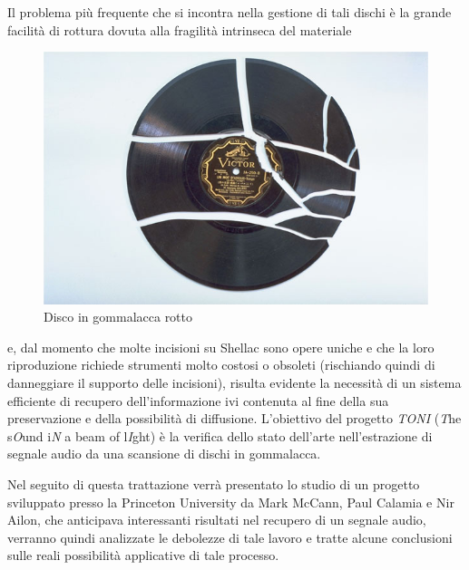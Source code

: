 Il problema pi\`u frequente che si incontra nella gestione di tali dischi \`e la grande facilit\`a di rottura dovuta alla fragilit\`a intrinseca del materiale
\begin{figure}[h!t]
\begin{center}
\includegraphics[scale=0.4]{./img/broken_disc.jpg}
\caption{Disco in gommalacca rotto}
\end{center}
\end{figure}
 e, dal momento che molte incisioni su Shellac sono opere uniche e che la loro riproduzione richiede strumenti molto costosi o obsoleti (rischiando quindi di danneggiare il supporto delle incisioni), risulta evidente la necessit\`a di un sistema efficiente di recupero dell'informazione ivi contenuta al fine della sua preservazione e della possibilit\`a di diffusione.
L'obiettivo del progetto \emph{TONI} (\emph{T}he s\emph{O}und i\emph{N} a beam of l\emph{I}ght) \`e la verifica dello stato dell'arte nell'estrazione di segnale audio da una scansione di dischi in gommalacca.

Nel seguito di questa trattazione verr\`a presentato lo studio di un progetto sviluppato presso la Princeton University da Mark McCann, Paul Calamia e Nir Ailon, che anticipava interessanti risultati nel recupero di un segnale audio, verranno quindi analizzate le debolezze di tale lavoro e tratte alcune conclusioni sulle reali possibilit\`a applicative di tale processo.

% 
% 
